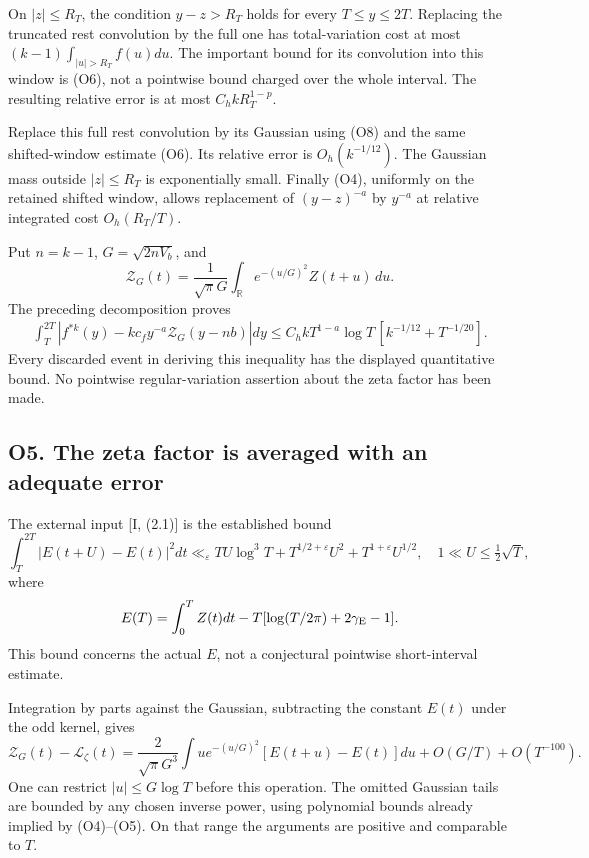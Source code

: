 On \(|z|\le R_T\), the condition \(y-z>R_T\) holds for every
\(T\le y\le2T\). Replacing the truncated rest convolution by the full
one has total-variation cost at most \((k-1)\int_{|u|>R_T}f(u)du\). The
important bound for its convolution into this window is (O6), not a
pointwise bound charged over the whole interval. The resulting relative
error is at most \(C_h kR_T^{1-p}\).

Replace this full rest convolution by its Gaussian using (O8) and the
same shifted-window estimate (O6). Its relative error is
\(O_h(k^{-1/12})\). The Gaussian mass outside \(|z|\le R_T\) is
exponentially small. Finally (O4), uniformly on the retained shifted
window, allows replacement of \((y-z)^{-a}\) by \(y^{-a}\) at relative
integrated cost \(O_h(R_T/T)\).

Put \(n=k-1\), \(G=\sqrt{2nV_b}\), and \[
\mathcal Z_G(t)=\frac1{\sqrt\pi G}
\int_{\mathbb R}e^{-(u/G)^2}Z(t+u)\,du.
\] The preceding decomposition proves \[
\boxed{\begin{aligned}
\int_T^{2T}\left|f^{*k}(y)-kc_fy^{-a}
\mathcal Z_G(y-nb)\right|dy
\le C_h kT^{1-a}\log T\,[k^{-1/12}+T^{-1/20}].
\end{aligned}}\tag{O13}
\] Every discarded event in deriving this inequality has the displayed
quantitative bound. No pointwise regular-variation assertion about the
zeta factor has been made.

\subsection{O5. The zeta factor is averaged with an adequate
error}\label{sa:o5.-the-zeta-factor-is-averaged-with-an-adequate-error}

The external input {[}I, (2.1){]} is the established bound \[
\int_T^{2T}|E(t+U)-E(t)|^2dt
\ll_\varepsilon TU\log^3T+
T^{1/2+\varepsilon}U^2+T^{1+\varepsilon}U^{1/2},
\quad 1\ll U\le\tfrac12\sqrt T,
\tag{O14}
\] where \[
E(T)=\int_0^T Z(t)dt-T[\log(T/2\pi)+2\gamma_{\rm E}-1].
\] This bound concerns the actual \(E\), not a conjectural pointwise
short-interval estimate.

Integration by parts against the Gaussian, subtracting the constant
\(E(t)\) under the odd kernel, gives \[
\mathcal Z_G(t)-\mathcal L_\zeta(t)
=\frac2{\sqrt\pi G^3}\int u e^{-(u/G)^2}
[E(t+u)-E(t)]du+O(G/T)+O(T^{-100}).\tag{O15}
\] One can restrict \(|u|\le G\log T\) before this operation. The
omitted Gaussian tails are bounded by any chosen inverse power, using
polynomial bounds already implied by (O4)--(O5). On that range the
arguments are positive and comparable to \(T\).

